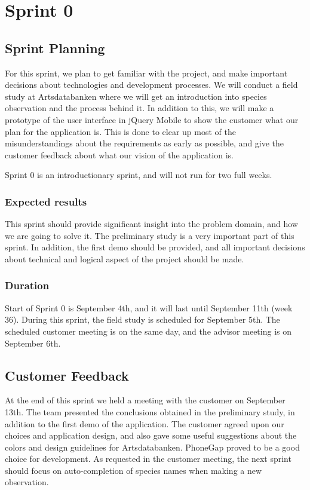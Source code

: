 \section{Sprint 0}

\subsection{Sprint Planning}
For this sprint, we plan to get familiar with the project, and make important
decisions about technologies and development processes. We will conduct a field
study at Artsdatabanken where we will get an introduction into species
observation and the process behind it. In addition to this, we will make a
prototype of the user interface in jQuery Mobile to show the customer what our
plan for the application is. This is done to clear up most of the
misunderstandings about the requirements as early as possible, and give the
customer feedback about what our vision of the application is. 

Sprint 0 is an introductionary sprint, and will not run for two full weeks.

\subsubsection{Expected results}
This sprint should provide significant
insight into the problem domain, and how we are going to solve it. The
preliminary study is a very important part of this sprint. In addition, the
first demo should be provided, and all important decisions about technical and
logical aspect of the project should be made.

\subsubsection{Duration}
Start of Sprint 0 is September 4th, and it will last
until September 11th (week 36). During this sprint, the field study is
scheduled for September 5th. The scheduled customer meeting is on the same
day, and the advisor meeting is on September 6th.



\subsection{Customer Feedback}
At the end of this sprint we held a meeting with
the customer on September 13th. The team presented the conclusions obtained in
the preliminary study, in addition to the first demo of the application. The
customer agreed upon our choices and application design, and also gave some
useful suggestions about the colors and design guidelines for Artsdatabanken.
PhoneGap proved to be a good choice for development.  As requested in the
customer meeting, the next sprint should focus on auto-completion of species
names when making a new observation.

